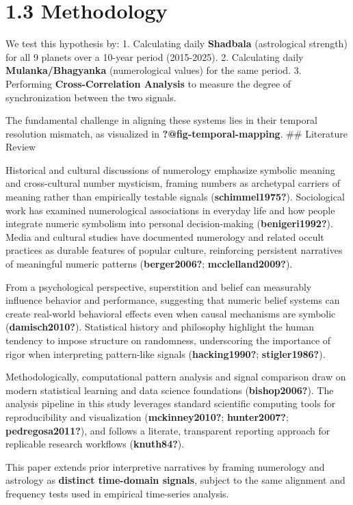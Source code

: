 \documentclass[
  11pt,
  a4paper,
  oneside,
  openany]{report}
\begin{document}
\section{1.3 Methodology}\label{methodology}

We test this hypothesis by: 1. Calculating daily \textbf{Shadbala}
(astrological strength) for all 9 planets over a 10-year period
(2015-2025). 2. Calculating daily \textbf{Mulanka/Bhagyanka}
(numerological values) for the same period. 3. Performing
\textbf{Cross-Correlation Analysis} to measure the degree of
synchronization between the two signals.

The fundamental challenge in aligning these systems lies in their
temporal resolution mismatch, as visualized in
\textbf{?@fig-temporal-mapping}. \#\# Literature Review

Historical and cultural discussions of numerology emphasize symbolic
meaning and cross-cultural number mysticism, framing numbers as
archetypal carriers of meaning rather than empirically testable signals
(\textbf{schimmel1975?}). Sociological work has examined numerological
associations in everyday life and how people integrate numeric symbolism
into personal decision-making (\textbf{benigeri1992?}). Media and
cultural studies have documented numerology and related occult practices
as durable features of popular culture, reinforcing persistent
narratives of meaningful numeric patterns (\textbf{berger2006?};
\textbf{mcclelland2009?}).

From a psychological perspective, superstition and belief can measurably
influence behavior and performance, suggesting that numeric belief
systems can create real-world behavioral effects even when causal
mechanisms are symbolic (\textbf{damisch2010?}). Statistical history and
philosophy highlight the human tendency to impose structure on
randomness, underscoring the importance of rigor when interpreting
pattern-like signals (\textbf{hacking1990?}; \textbf{stigler1986?}).

Methodologically, computational pattern analysis and signal comparison
draw on modern statistical learning and data science foundations
(\textbf{bishop2006?}). The analysis pipeline in this study leverages
standard scientific computing tools for reproducibility and
visualization (\textbf{mckinney2010?}; \textbf{hunter2007?};
\textbf{pedregosa2011?}), and follows a literate, transparent reporting
approach for replicable research workflows (\textbf{knuth84?}).

This paper extends prior interpretive narratives by framing numerology
and astrology as \textbf{distinct time-domain signals}, subject to the
same alignment and frequency tests used in empirical time-series
analysis.
\end{document}
